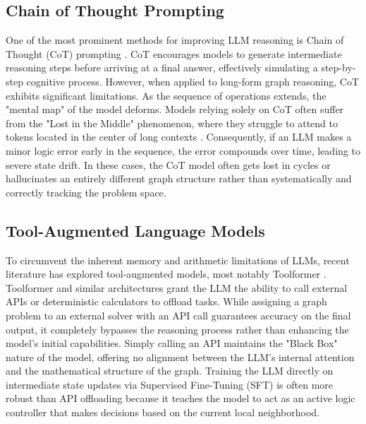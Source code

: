 \documentclass[sigplan,screen]{acmart}
\begin{document}
\subsection{Chain of Thought Prompting}
One of the most prominent methods for improving LLM reasoning is Chain of Thought (CoT) prompting \cite{wei2022chain}. CoT encourages models to generate intermediate reasoning steps before arriving at a final answer, effectively simulating a step-by-step cognitive process. However, when applied to long-form graph reasoning, CoT exhibits significant limitations. As the sequence of operations extends, the "mental map" of the model deforms. Models relying solely on CoT often suffer from the "Lost in the Middle" phenomenon, where they struggle to attend to tokens located in the center of long contexts \cite{liu2023lost}. Consequently, if an LLM makes a minor logic error early in the sequence, the error compounds over time, leading to severe state drift. In these cases, the CoT model often gets lost in cycles or hallucinates an entirely different graph structure rather than systematically and correctly tracking the problem space.

\subsection{Tool-Augmented Language Models}
To circumvent the inherent memory and arithmetic limitations of LLMs, recent literature has explored tool-augmented models, most notably Toolformer \cite{schick2023toolformer}. Toolformer and similar architectures grant the LLM the ability to call external APIs or deterministic calculators to offload tasks. While assigning a graph problem to an external solver with an API call guarantees accuracy on the final output, it completely bypasses the reasoning process rather than enhancing the model's initial capabilities. Simply calling an API maintains the "Black Box" nature of the model, offering no alignment between the LLM's internal attention and the mathematical structure of the graph. Training the LLM directly on intermediate state updates via Supervised Fine-Tuning (SFT) is often more robust than API offloading because it teaches the model to act as an active logic controller that makes decisions based on the current local neighborhood.
\end{document}
